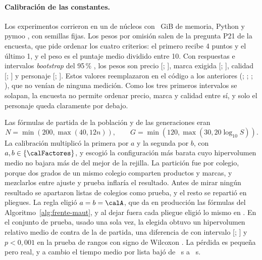 \paragraph{Calibración de las constantes.} Los experimentos corrieron en un \calCPU{} de
\calNucleos{} núcleos con \calRAM~GiB de memoria, Python \calPython{} y pymoo \calPymoo, con semillas
fijas. Los pesos por omisión salen de la pregunta P21 de la encuesta, que pide ordenar los cuatro
criterios: el primero recibe 4 puntos y el último 1, y el peso es el puntaje medio dividido entre 10.
Con \calEncuestados{} respuestas e intervalos \emph{bootstrap} del 95\,\%
\citep{efron_bootstrap_1979}, los pesos son precio \calWPrecio{} [\calWPrecioBajo; \calWPrecioAlto],
marca exigida \calWMarca{} [\calWMarcaBajo; \calWMarcaAlto], calidad \calWCalidad{}
[\calWCalidadBajo; \calWCalidadAlto] y personaje \calWPersonaje{} [\calWPersonajeBajo;
\calWPersonajeAlto]. Estos valores reemplazaron en el código a los anteriores (\calWPrecioAntes;
\calWMarcaAntes; \calWCalidadAntes; \calWPersonajeAntes), que no venían de ninguna medición. Como los
tres primeros intervalos se solapan, la encuesta no permite ordenar precio, marca y calidad entre sí,
y solo el personaje queda claramente por debajo.

Las fórmulas de partida de la población y de las generaciones eran
\[N=\min(200,\max(40,12n)),\qquad G=\min(120,\max(30,20\log_{10}S)).\] La calibración multiplicó la primera por $a$ y la segunda por
$b$, con $a,b\in\{\calFactores\}$, y escogió la configuración más barata cuyo hipervolumen medio no
bajara más de \calUmbralHV{} del mejor de la rejilla. La partición fue por colegio, porque dos grados
de un mismo colegio comparten productos y marcas, y mezclarlos entre ajuste y prueba inflaría el
resultado. Antes de mirar ningún resultado se apartaron \calPrueba{} listas de \calColegiosPrueba{}
colegios como prueba, y el resto se repartió en \calPliegues{} pliegues. La regla eligió $a=b=\calA$,
que da en producción las fórmulas del Algoritmo~\ref{alg:frente-maut}, y al dejar fuera cada pliegue
eligió lo mismo en \calPlieguesIguales. En el conjunto de prueba, usado una sola vez, la elegida
obtuvo un hipervolumen relativo medio de \calPruebaElegidaHV{} contra \calPruebaActualHV{} de la de
partida, una diferencia de \calDifHV{} con intervalo [\calDifHVBajo; \calDifHVAlto]
y $p<0{,}001$ en la prueba de rangos con signo de Wilcoxon \citep{wilcoxon_individual_1945}. La
pérdida es pequeña pero real, y a cambio el tiempo medio por lista bajó de \calPruebaActualT~s a
\calPruebaElegidaT~s.


